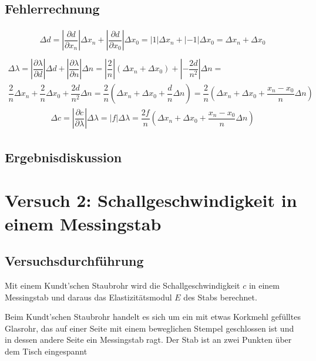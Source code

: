 \documentclass{scrartcl}
\begin{document}
\subsection{Fehlerrechnung}
\begin{align*}
\Delta d = \left| \dfrac{\partial d}{\partial x_{n}} \right| \Delta x_{n} + \left| \dfrac{\partial d}{\partial x_{0}} \right| \Delta x_{0} = \left| 1 \right| \Delta x_{n} + \left| -1 \right| \Delta x_{0} = \Delta x_{n} + \Delta x_{0} \\
\end{align*}
\begin{align*}
\Delta \lambda = \left| \dfrac{\partial \lambda}{\partial d} \right| \Delta d + \left| \dfrac{\partial \lambda}{\partial n} \right| \Delta n = \left| \dfrac{2}{n} \right| (\Delta x_{n} + \Delta x_{0}) + \left| - \dfrac{2d}{n^2} \right| \Delta n = \\
\dfrac{2}{n} \Delta x_{n} + \dfrac{2}{n} \Delta x_{0} + \dfrac{2d}{n^2} \Delta n = \dfrac{2}{n} (\Delta x_{n} + \Delta x_{0} + \dfrac{d}{n} \Delta n) = \dfrac{2}{n} (\Delta x_{n} + \Delta x_{0} + \dfrac{x_{n} - x_{0}}{n} \Delta n)
\end{align*}
\begin{align*}
\Delta c = \left| \dfrac{\partial c}{\partial \lambda} \right| \Delta \lambda = \left| f \right| \Delta \lambda = \dfrac{2f}{n} (\Delta x_{n} + \Delta x_{0} + \dfrac{x_{n} - x_{0}}{n} \Delta n)
\end{align*}
\subsection{Ergebnisdiskussion}


\section{Versuch 2: Schallgeschwindigkeit in einem Messingstab}
\subsection{Versuchsdurchführung}
Mit einem Kundt'schen Staubrohr wird die Schallgeschwindigkeit $c$ in einem Messingstab und daraus das Elastizitätsmodul $E$ des Stabs berechnet.

Beim Kundt'schen Staubrohr handelt es sich um ein mit etwas Korkmehl gefülltes Glasrohr, das auf einer Seite mit einem beweglichen Stempel geschlossen ist und in dessen andere Seite ein Messingstab ragt. Der Stab ist an zwei Punkten über dem Tisch eingespannt
\end{document}
